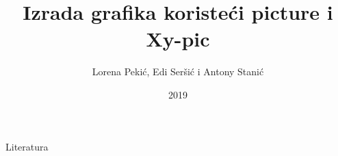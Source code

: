 \documentclass[17p]{beamer}
\title{Izrada grafika koristeći picture i Xy-pic}
\author{Lorena Pekić, Edi Seršić i Antony Stanić}
\date{2019}
\begin{document}
\frame{\titlepage}











\begin{frame}[shrink=20]{Literatura}


\nocite{IZVOR:1,IZVOR:2,IZVOR:3,IZVOR:4,IZVOR:5,IZVOR:6}

\end{frame}
\end{document}
